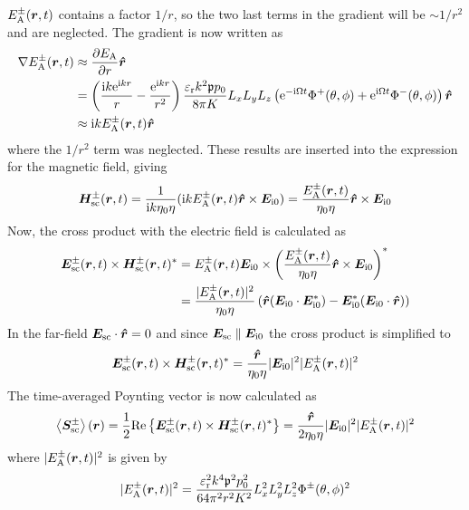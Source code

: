 \documentclass[11pt,twoside]{eitExjobb}
\begin{document}
	$E_{\mathrm{A}}^\pm (\bm{r}, t)$ contains a factor $1/r$, so the two last terms in the gradient will be $\sim 1/r^2$ and are neglected. The gradient is now written as
	\begin{equation*}
	\begin{split}
		\nabla E_{\mathrm{A}}^\pm (\bm{r}, t) &\approx \frac{\partial E_{\mathrm{A}}}{\partial r} \bm{\hat{r}} \\
		&= \left( \frac{\mathrm{i} k\mathrm{e}^{\mathrm{i} kr}}{r} - \frac{\mathrm{e}^{\mathrm{i} kr}}{r^2} \right) \frac{\varepsilon_{\mathrm{r}}k^2 \mathfrak{p} p_0}{8\pi K} L_{x} L_{y} L_{z} \left( \mathrm{e}^{- \mathrm{i} \Omega t} \Phi^+ (\theta,\phi) + \mathrm{e}^{\mathrm{i} \Omega t} \Phi^- (\theta,\phi) \right) \bm{\hat{r}} \\
		&\approx \mathrm{i} kE_{\mathrm{A}}^\pm (\bm{r}, t) \bm{\hat{r}}
	\end{split}
	\end{equation*}
	where the $1/r^2$ term was neglected. These results are inserted into the expression for the magnetic field, giving
	\begin{equation*}
		\bm{H}_{\mathrm{sc}}^\pm (\bm{r}, t) = \frac{1}{\mathrm{i} k \eta_0 \eta} (\mathrm{i} kE_{\mathrm{A}}^\pm (\bm{r}, t) \bm{\hat{r}} \times \bm{E}_{\mathrm{i}0}) = \frac{E_{\mathrm{A}}^\pm (\bm{r}, t)}{ \eta_0 \eta} \bm{\hat{r}} \times \bm{E}_{\mathrm{i}0}
	\end{equation*}
	Now, the cross product with the electric field is calculated as
	\begin{equation*}
	\begin{split}
		\bm{E}_{\mathrm{sc}}^\pm (\bm{r}, t) \times \bm{H}_{\mathrm{sc}}^{\pm} (\bm{r}, t)^* &= E_{\mathrm{A}}^\pm (\bm{r}, t) \bm{E}_{\mathrm{i}0} \times \left( \frac{E_{\mathrm{A}}^\pm (\bm{r}, t)}{ \eta_0 \eta} \bm{\hat{r}} \times \bm{E}_{\mathrm{i}0} \right)^* \\
		&= \frac{|E_{\mathrm{A}}^\pm (\bm{r}, t)|^2}{\eta_0 \eta} \left( \bm{\hat{r}} (\bm{E}_{\mathrm{i}0} \cdot \bm{E}_{\mathrm{i}0}^*) - \bm{E}_{\mathrm{i}0}^* (\bm{E}_{\mathrm{i}0} \cdot \bm{\hat{r}}) \right)
	\end{split}
	\end{equation*}
	In the far-field $\bm{E}_{\mathrm{sc}} \cdot \bm{\hat{r}} = 0$ \addref and since $\bm{E}_{\mathrm{sc}} \parallel \bm{E}_{\mathrm{i}0}$ the cross product is simplified to
	\begin{equation*}
		\bm{E}_{\mathrm{sc}}^\pm (\bm{r}, t) \times \bm{H}_{\mathrm{sc}}^{\pm} (\bm{r}, t)^* = \frac{\bm{\hat{r}}}{\eta_0 \eta} |\bm{E}_{\mathrm{i}0}|^2 |E_{\mathrm{A}}^\pm (\bm{r},t)|^2
	\end{equation*}
	The time-averaged Poynting vector is now calculated as
	\begin{equation*}
		\left< \bm{S}_{\mathrm{sc}}^\pm \right> (\bm{r}) = \frac{1}{2}\mathrm{Re}\left\{ \bm{E}_{\mathrm{sc}}^\pm (\bm{r}, t) \times \bm{H}_{\mathrm{sc}}^{\pm} (\bm{r}, t)^* \right\} = \frac{\bm{\hat{r}}}{2\eta_0 \eta} |\bm{E}_{\mathrm{i}0}|^2 |E_{\mathrm{A}}^\pm (\bm{r},t)|^2
	\end{equation*}
	where $|E_{\mathrm{A}}^\pm (\bm{r},t)|^2$ is given by
	\begin{equation*}
		|E_{\mathrm{A}}^\pm (\bm{r},t)|^2 = \frac{\varepsilon_{\mathrm{r}}^2 k^4 \mathfrak{p}^2 p_0^2}{64\pi^2 r^2 K^2} L_{x}^2 L_{y}^2 L_{z}^2 \Phi^\pm (\theta,\phi)^2
	\end{equation*}
	
\end{document}
